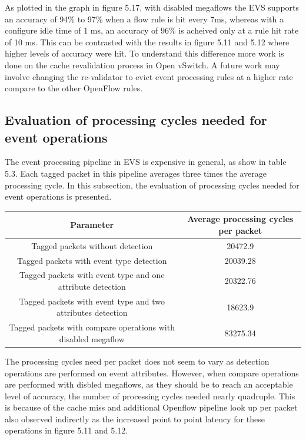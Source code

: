 As plotted in the graph in figure 5.17, with disabled megaflows the EVS supports an accuracy of 94\% to 97\% when a flow rule is hit every 7ms, whereas with a configure idle time of 1 ms, an accuracy of 96\% is acheived only at a rule hit rate of 10 ms. This can be contrasted with the results in figure 5.11 and 5.12 where higher levels of accuracy were hit. To understand this difference more work is done on the cache revalidation process in Open vSwitch. A future work may involve changing the re-validator to evict event processing rules at a higher rate compare to the other OpenFlow rules.


\subsection{Evaluation of processing cycles needed for event operations}
 The event processing pipeline in EVS is expensive in general, as show in table 5.3. Each tagged packet in this pipeline averages three times the average processing cycle. In this subsection, the evaluation of processing cycles needed  for event operations is presented.
 
 
\begin{center}
	 \label{tab:title} 
	\begin{tabular}{ |c|c| }
		\hline
		\textbf{Parameter} &  \textbf{Average processing cycles per packet} \\\toprule
		\hline
		Tagged packets without detection  &  20472.9 \\
		\hline 
		Tagged packets with event type detection  & 20039.28 \\
		\hline		
		Tagged packets with event type and one attribute detection  &  20322.76  \\ 
		\hline
		Tagged packets with event type and two attributes detection  &  18623.9  \\ 
		\hline		
		Tagged packets with compare operations with disabled megaflow    &  83275.34  \\\bottomrule		
	\end{tabular}
\end{center} 

The processing cycles need per packet does not seem to vary as detection operations are performed on event attributes. However, when compare operations are performed with disbled megaflows, as they should be to reach an acceptable level of accuracy, the number of processing cycles needed nearly quadruple. This is because of the cache miss and additional Openflow pipeline look up per packet also observed indirectly as the increased point to point latency for these operations in figure 5.11 and 5.12.


